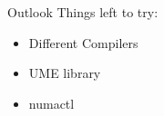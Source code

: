 \begin{frame}{Outlook} 
Things left to try:
	\begin{itemize}
		\item Different Compilers
		\item UME library
		\item numactl
	\end{itemize}
	
\end{frame}
 
